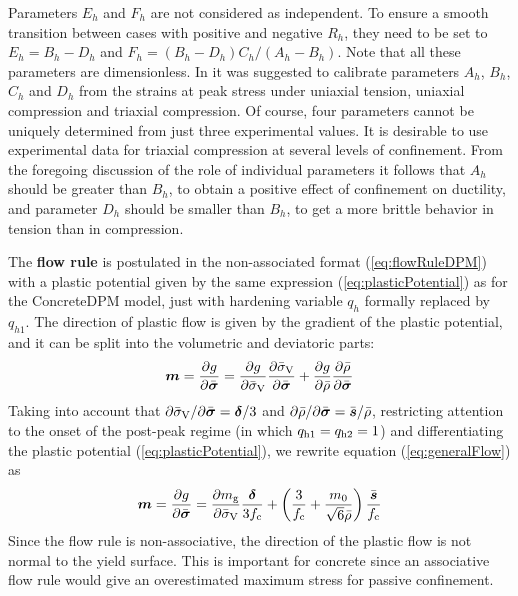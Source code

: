\documentclass[a4paper]{article}
\newcommand{\mbf}[1]{\mbox{\boldmath$#1$}}
\begin{document}
Parameters $E_h$ and $F_h$ are not considered as independent.
To ensure a smooth transition between cases with positive and
negative $R_h$, they need to be set to $E_h=B_h-D_h$ and
$F_h=(B_h-D_h)C_h/(A_h-B_h)$. Note that all these parameters
are dimensionless. In \cite{GraXenNys13} it was suggested to
calibrate parameters $A_h$, $B_h$, $C_h$ and $D_h$ from the strains
at peak stress under uniaxial tension, uniaxial compression and triaxial
compression. Of course, four parameters cannot be uniquely
determined from just three experimental values. It is desirable to
use experimental data for triaxial compression at
several levels of confinement. From the foregoing discussion of the role
of individual parameters it follows that $A_h$ should be greater 
than $B_h$, to obtain a positive effect of confinement on ductility,
and parameter $D_h$ should be  smaller than $B_h$, to get a more brittle behavior
in tension than in compression. 

The {\bf flow rule} is postulated in the non-associated format (\ref{eq:flowRuleDPM})
with a plastic potential given  by the same expression (\ref{eq:plasticPotential})
as for the ConcreteDPM model, just with hardening variable $q_h$ formally replaced by $q_{h1}$.
The direction of plastic flow is given by the gradient of the plastic potential,
and it can be split into the volumetric and deviatoric parts:
%
\begin{equation}\label{eq:generalFlow}
\boldsymbol{m} = \dfrac{\partial g}{\partial \bar{\boldsymbol{\sigma}} } = \frac{\partial g}{\partial \bar{\sigma}_{\rm V}} \frac{\partial \bar{\sigma}_{\rm V}}{\partial \bar{\boldsymbol{\sigma}}} + \frac{\partial g}{\partial \bar{\rho}} \frac{\partial \bar{\rho} }{\partial \bar{\boldsymbol{\sigma}}}
\end{equation}
Taking into account that $\partial\bar{\sigma}_{\rm V}/\partial\bar{\boldsymbol{\sigma}}=\boldsymbol{\delta}/3$ and $\partial\bar{\rho}/\partial\bar{\boldsymbol{\sigma}}=\bar{\mbf{s}}/\bar\rho$, restricting attention to the onset of the post-peak regime (in which $q_{\rm h1} = q_{\rm h2} = 1$) and differentiating the plastic potential (\ref{eq:plasticPotential}), we rewrite equation (\ref{eq:generalFlow}) as
\begin{equation}\label{eq:detailedFlow}
\mbf{m} = \dfrac{\partial g}{\partial \bar{\boldsymbol{\sigma}}} =  \frac{{\partial}{m_{\rm g}}}{{\partial}{\bar{\sigma}_{\rm V}}} \frac{\boldsymbol{\delta}}{3f_{\rm c}} 
 + \left(\frac{3}{f_{\rm c}} + \frac{m_0}{\sqrt{6}\bar\rho} \right)\frac{\bar{\mbf{s}}}{f_{\rm c}}
\end{equation}
Since the flow rule is non-associative, the direction of the plastic flow is not normal to the yield surface. This is important for concrete since an associative flow rule would give an overestimated maximum stress for passive confinement. 
\end{document}
